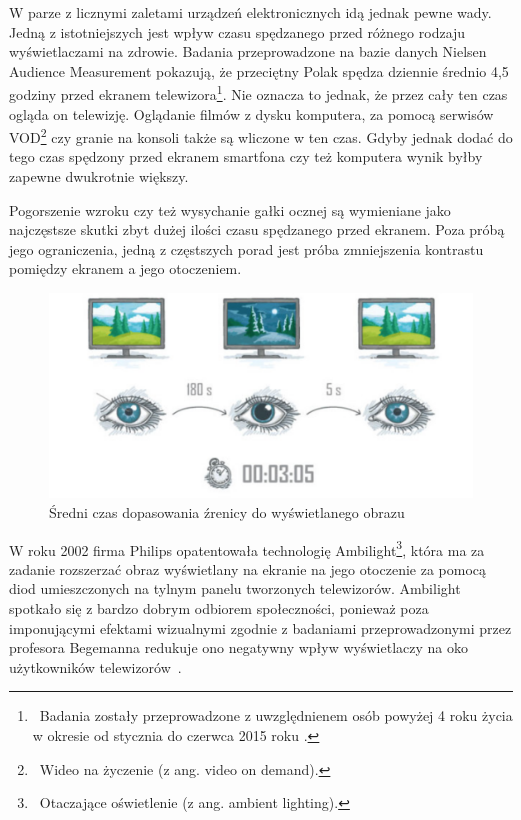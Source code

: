 \documentclass[12pt]{report}
\begin{document}
W parze z licznymi zaletami urządzeń elektronicznych idą jednak pewne wady. Jedną z istotniejszych jest wpływ czasu spędzanego przed różnego rodzaju wyświetlaczami na zdrowie. Badania przeprowadzone na bazie danych Nielsen Audience Measurement pokazują, że przeciętny Polak spędza dziennie średnio 4,5 godziny przed ekranem telewizora\footnote{~Badania zostały przeprowadzone z uwzględnienem osób powyżej 4 roku życia w okresie od stycznia do czerwca 2015 roku \cite{czasprzedtv}.}. Nie oznacza to jednak, że przez cały ten czas ogląda on telewizję. Oglądanie filmów z dysku komputera, za pomocą serwisów VOD\footnote{~Wideo na życzenie (z ang. video on demand).} czy granie na konsoli także są wliczone w ten czas. Gdyby jednak dodać do tego czas spędzony przed ekranem smartfona czy też komputera wynik byłby zapewne dwukrotnie większy.

Pogorszenie wzroku czy też wysychanie gałki ocznej są wymieniane jako naj\-częstsze skutki zbyt dużej ilości czasu spędzanego przed ekranem. Poza próbą jego ograniczenia, jedną z częstszych porad jest próba zmniejszenia kontrastu pomiędzy ekranem a jego otoczeniem.

\begin{figure}[h]
\centering
\includegraphics[width=.7\textwidth]{../resources/focuswo.png}
\caption[Średni czas dopasowania źrenicy do wyświetlanego obrazu]{Średni czas dopasowania źrenicy do wyświetlanego obrazu \cite{diagramoko}}
\end{figure}

W roku 2002 firma Philips opatentowała technologię Ambilight\footnote{~Otaczające oświetlenie (z ang. ambient lighting).}, która ma za zadanie rozszerzać obraz wyświetlany na ekranie na jego otoczenie za pomocą diod umieszczonych na tylnym panelu tworzonych telewizorów. Ambilight spotkało się z bardzo dobrym odbiorem społeczności, ponieważ poza imponującymi efektami wizualnymi zgodnie z badaniami przeprowadzonymi przez profesora Begemanna redukuje ono negatywny wpływ wyświetlaczy na oko użytkowników telewizorów~\cite{ambilightaoko}. 
\end{document}
